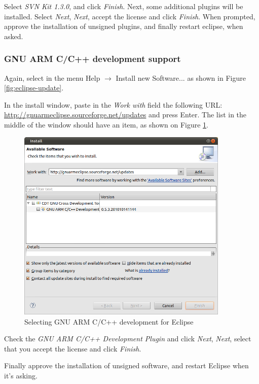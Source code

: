 \documentclass[a4paper, 10pt]{article}
\begin{document}
Select \emph{SVN Kit 1.3.0}, and click \emph{Finish}. Next, some additional plugins
will be installed. 
Select \emph{Next},
\emph{Next}, accept the license and click \emph{Finish}.
When prompted, approve the installation of unsigned plugins,
and finally restart eclipse, when asked.


\subsubsection{GNU ARM C/C++ development support}

Again, select in the menu Help $\rightarrow$ Install new Software... as shown in
Figure \ref{fig:eclipse-update}.

In the install window, paste in the \emph{Work with} field
the following URL:
\url{http://gnuarmeclipse.sourceforge.net/updates} and press Enter.
The list in the middle of the window should have an item, as shown on
Figure \ref{fig:eclipse-gnu-arm}.

    \begin{figure}[H]
    \centering
        \includegraphics[width=0.9\textwidth]{./png-install-guide/eclipse-gnu-arm.png}
        \caption{Selecting GNU ARM C/C++ development for Eclipse}
        \label{fig:eclipse-gnu-arm}
    \end{figure}

Check the \emph{GNU ARM C/C++ Development Plugin} and click \emph{Next},
\emph{Next}, select that you accept the license and click \emph{Finish}.

Finally approve the installation of unsigned software, 
and restart Eclipse when it's asking.
\end{document}
